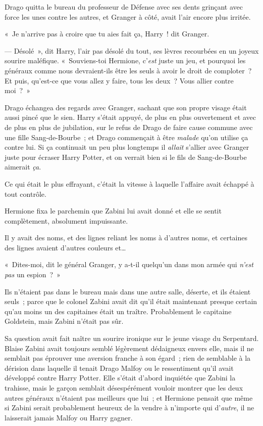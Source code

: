 Drago quitta le bureau du professeur de Défense avec ses dents grinçant avec force les unes contre les autres, et Granger à côté, avait l'air encore plus irritée.

«~Je n'arrive pas à croire que tu aies fait ça, Harry~! dit Granger.

--- Désolé~», dit Harry, l'air pas désolé du tout, ses lèvres recourbées en un joyeux sourire maléfique.
«~Souviens-toi Hermione, c'\emph{est} juste un jeu, et pourquoi les généraux comme nous devraient-ils être les seuls à avoir le droit de comploter~?
Et puis, qu'est-ce que vous allez y faire, tous les deux~?
Vous allier contre moi~?~»

Drago échangea des regards avec Granger, sachant que son propre visage était aussi pincé que le sien.
Harry s'était appuyé, de plus en plus ouvertement et avec de plus en plus de jubilation, sur le refus de Drago de faire cause commune avec une fille Sang-de-Bourbe~; et Drago commençait à être \emph{malade} qu'on utilise ça contre lui.
Si ça continuait un peu plus longtemps il \emph{allait} s'allier avec Granger juste pour écraser Harry Potter, et on verrait bien si le fils de Sang-de-Bourbe aimerait \emph{ça}.

\later

Ce qui était le plus effrayant, c'était la vitesse à laquelle l'affaire avait échappé à tout contrôle.

Hermione fixa le parchemin que Zabini lui avait donné et elle se sentit complètement, absolument impuissante.

Il y avait des noms, et des lignes reliant les noms à d'autres noms, et certaines des lignes avaient d'autres couleurs et…

«~Dites-moi, dit le général Granger, y a-t-il quelqu'un dans mon armée qui \emph{n'est pas} un espion~?~»

Ils n'étaient pas dans le bureau mais dans une autre salle, déserte, et ils étaient seuls~; parce que le colonel Zabini avait dit qu'il était maintenant presque certain qu'au moins un des capitaines était un traître.
Probablement le capitaine Goldstein, mais Zabini n'était pas sûr.

Sa question avait fait naître un sourire ironique sur le jeune visage du Serpentard.
Blaise Zabini avait toujours semblé légèrement dédaigneux envers elle, mais il ne semblait pas éprouver une aversion franche à son égard~; rien de semblable à la dérision dans laquelle il tenait Drago Malfoy ou le ressentiment qu'il avait développé contre Harry Potter.
Elle s'était d'abord inquiétée que Zabini la trahisse, mais le garçon semblait désespérément vouloir montrer que les deux autres généraux n'étaient pas meilleurs que lui~; et Hermione pensait que même si Zabini serait probablement heureux de la vendre à n'importe qui d'\emph{autre}, il ne laisserait jamais Malfoy ou Harry gagner.

